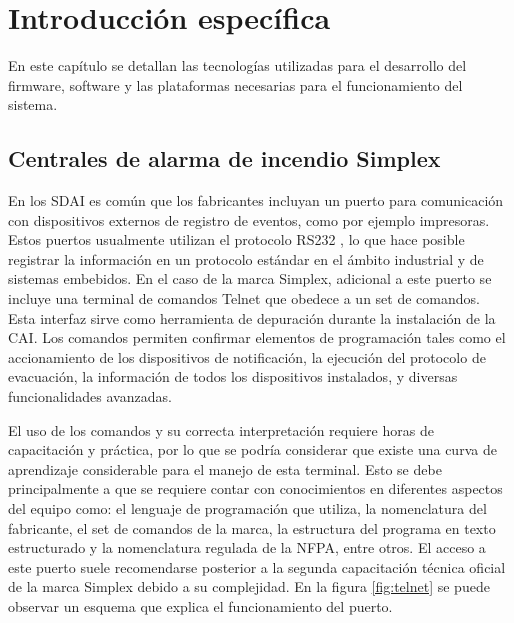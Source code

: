 \chapter{Introducción específica} %

\label{Chapter2}

En este capítulo se detallan las tecnologías utilizadas para el desarrollo del firmware, software y las plataformas necesarias para el funcionamiento del sistema.

\section{Centrales de alarma de incendio Simplex}
En los SDAI es común que los fabricantes incluyan un puerto para comunicación con dispositivos externos de registro de eventos, como por ejemplo impresoras. Estos puertos usualmente utilizan el protocolo RS232 \citep{rs232}, lo que hace posible registrar la información en un protocolo estándar en el ámbito industrial y de sistemas embebidos. En el caso de la marca Simplex, adicional a este puerto se incluye una terminal de comandos Telnet \citep{telnet} que obedece a un set de comandos. Esta interfaz sirve como herramienta de depuración durante la instalación de la CAI. Los comandos permiten confirmar elementos de programación tales como el accionamiento de los dispositivos de notificación, la ejecución del protocolo de evacuación, la información de todos los dispositivos instalados, y diversas funcionalidades avanzadas.

El uso de los comandos y su correcta interpretación requiere horas de capacitación y práctica, por lo que se podría considerar que existe una curva de aprendizaje considerable para el manejo de esta terminal. Esto se debe principalmente a que se requiere contar con conocimientos en diferentes aspectos del equipo como: el lenguaje de programación que utiliza, la nomenclatura del fabricante, el set de comandos de la marca, la estructura del programa en texto estructurado y la nomenclatura regulada de la NFPA, entre otros.  El acceso a este puerto suele recomendarse posterior a la segunda capacitación técnica oficial de la marca Simplex debido a su complejidad. En la figura \ref{fig:telnet} se puede observar un esquema que explica el funcionamiento del puerto.

